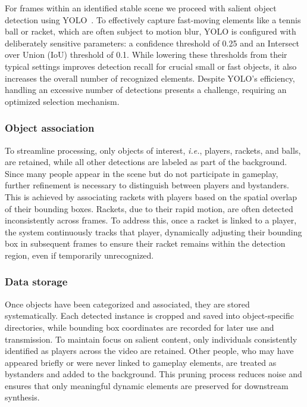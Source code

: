 \documentclass[manuscript, screen]{acmart}
\newcommand{\ie}{\emph{i.e.}, }
\begin{document}
For frames within an identified stable scene we proceed with salient object detection using YOLO~\cite{redmon2016yolo}. To effectively capture fast-moving elements like a tennis ball or racket, which are often subject to motion blur, YOLO is configured with deliberately sensitive parameters: a confidence threshold of \num{0.25} and an Intersect over Union (IoU) threshold of \num{0.1}. While lowering these thresholds from their typical settings improves detection recall for crucial small or fast objects, it also increases the overall number of recognized elements. Despite YOLO’s efficiency, handling an excessive number of detections presents a challenge, requiring an optimized selection mechanism.

\subsubsection*{Object association}
To streamline processing, only objects of interest, \ie players, rackets, and balls, are retained, while all other detections are labeled as part of the background. 
Since many people appear in the scene but do not participate in gameplay, further refinement is necessary to distinguish between players and bystanders. 
This is achieved by associating rackets with players based on the spatial overlap of their bounding boxes.
Rackets, due to their rapid motion, are often detected inconsistently across frames. 
To address this, once a racket is linked to a player, the system continuously tracks that player, dynamically adjusting their bounding box in subsequent frames to ensure their racket remains within the detection region, even if temporarily unrecognized.

\subsubsection*{Data storage}
Once objects have been categorized and associated, they are stored systematically. 
Each detected instance is cropped and saved into object-specific directories, while bounding box coordinates are recorded for later use and transmission. 
To maintain focus on salient content, only individuals consistently identified as players across the video are retained.
Other people, who may have appeared briefly or were never linked to gameplay elements, are treated as bystanders and added to the background.
This pruning process reduces noise and ensures that only meaningful dynamic elements are preserved for downstream synthesis.
\end{document}
